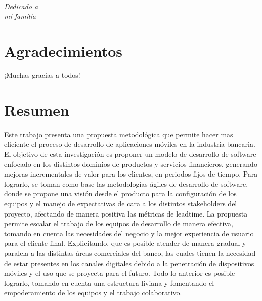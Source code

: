 \documentclass[a4paper,openright,12pt]{book}
\begin{document}
\newpage
$\ $
\thispagestyle{empty} %

\chapter*{}
\begin{flushright}
\textit{Dedicado a \\
mi familia}
\end{flushright}

\chapter*{Agradecimientos} %

¡Muchas gracias a todos!


\chapter*{Resumen} %

Este trabajo presenta una propuesta metodológica que permite hacer mas eficiente el proceso de desarrollo de aplicaciones móviles en la industria bancaria. El objetivo de esta investigación es proponer un modelo de desarrollo de software enfocado en los distintos dominios de productos y servicios financieros, generando mejoras incrementales de valor para los clientes, en periodos fijos de tiempo. Para lograrlo, se toman como base las metodologías ágiles de desarrollo de software, donde se propone una visión desde el producto para la configuración de los equipos y el manejo de expectativas de cara a los distintos stakeholders del proyecto, afectando de manera positiva las métricas de leadtime. La propuesta permite escalar el trabajo de los equipos de desarrollo de manera efectiva, tomando en cuenta las necesidades del negocio y la mejor experiencia de usuario para el cliente final. Explicitando, que es posible atender de manera gradual y paralela a las distintas áreas comerciales del banco, las cuales tienen la necesidad de estar presentes en los canales digitales debido a la penetración de dispositivos móviles y el uso que se proyecta para el futuro. Todo lo anterior es posible lograrlo, tomando en cuenta una estructura liviana y fomentando el empoderamiento de los equipos y el trabajo colaborativo.
\end{document}
